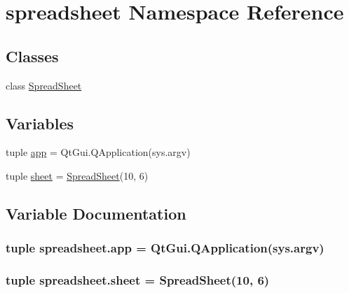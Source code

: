 \hypertarget{namespacespreadsheet}{}\section{spreadsheet Namespace Reference}
\label{namespacespreadsheet}
\subsection*{Classes}
\begin{DoxyCompactItemize}
\item 
class \hyperlink{classspreadsheet_1_1SpreadSheet}{Spread\+Sheet}
\end{DoxyCompactItemize}
\subsection*{Variables}
\begin{DoxyCompactItemize}
\item 
tuple \hyperlink{namespacespreadsheet_a615e1c183949bf7f0a379b1d4ca3aa72}{app} = Qt\+Gui.\+Q\+Application(sys.\+argv)
\item 
tuple \hyperlink{namespacespreadsheet_a390e50983aa5059e15bbb68a91655758}{sheet} = \hyperlink{classspreadsheet_1_1SpreadSheet}{Spread\+Sheet}(10, 6)
\end{DoxyCompactItemize}


\subsection{Variable Documentation}
\hypertarget{namespacespreadsheet_a615e1c183949bf7f0a379b1d4ca3aa72}{}
\subsubsection[{app}]{\setlength{\rightskip}{0pt plus 5cm}tuple spreadsheet.\+app = Qt\+Gui.\+Q\+Application(sys.\+argv)}\label{namespacespreadsheet_a615e1c183949bf7f0a379b1d4ca3aa72}
\hypertarget{namespacespreadsheet_a390e50983aa5059e15bbb68a91655758}{}
\subsubsection[{sheet}]{\setlength{\rightskip}{0pt plus 5cm}tuple spreadsheet.\+sheet = {\bf Spread\+Sheet}(10, 6)}\label{namespacespreadsheet_a390e50983aa5059e15bbb68a91655758}
